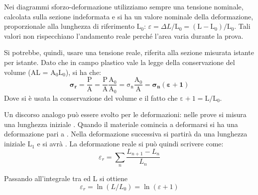 Nei diagrammi sforzo-deformazione utilizziamo sempre una tensione nominale, calcolata sulla sezione indeformata e si ha un valore nominale della deformazione, proporzionale alla lunghezza di riferimento $\mathrm{L_0}$: $\varepsilon=\Delta L/\mathrm{L_0}=\mathrm{(L-L_0)/L_0}$. Tali valori non rispecchiano l’andamento reale perché l’area varia durante la prova.

Si potrebbe, quindi, usare una tensione reale, riferita alla sezione misurata istante per istante. Dato che in campo plastico vale la legge della conservazione del volume (AL = $\mathrm{A_0L_0}$), si ha che:
\begin{equation*}
    \boldsymbol{\sigma_r}=\mathrm{\frac{P}{A}=\frac{P}{A}\frac{A_0}{A_0}=\sigma_n\frac{A_0}{A}=\boldsymbol{\sigma_n(\varepsilon+1)}}
\end{equation*}
Dove si è usata la conservazione del volume e il fatto che $\mathrm{\varepsilon+1=L/L_0}$.

Un discorso analogo può essere svolto per le deformazioni: nelle prove si misura una lunghezza iniziale . Quando il materiale comincia a deformarsi si ha una deformazione pari a . Nella deformazione successiva si partirà da una lunghezza iniziale $\mathrm{L_1}$ e si avrà .
La deformazione reale si può quindi scrivere come:
\begin{equation*}
    \varepsilon_r=\sum_n\frac{L_{n+1}-L_n}{L_n}
\end{equation*}

Passando all’integrale tra  ed L si ottiene 
\begin{equation*}
    \varepsilon_r= \ln(L/L_0)=\ln(\varepsilon+1)
\end{equation*}

